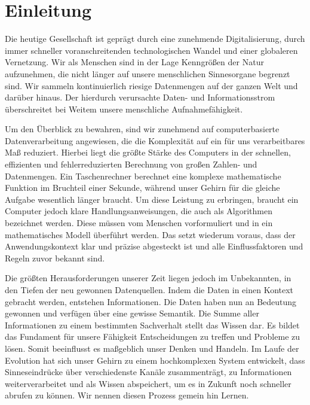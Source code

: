

\section{Einleitung}



Die heutige Gesellschaft ist geprägt durch eine zunehmende Digitalisierung, durch immer schneller voranschreitenden technologischen Wandel und einer globaleren Vernetzung. Wir als Menschen sind in der Lage Kenngrößen der Natur aufzunehmen, die nicht länger auf unsere menschlichen Sinnesorgane begrenzt sind. Wir sammeln kontinuierlich riesige Datenmengen auf der ganzen Welt und darüber hinaus. Der hierdurch verursachte Daten- und Informationsstrom überschreitet bei Weitem unsere menschliche Aufnahmefähigkeit.

Um den Überblick zu bewahren, sind wir zunehmend auf computerbasierte Datenverarbeitung angewiesen, die die Komplexität auf ein für uns verarbeitbares Maß reduziert. Hierbei liegt die größte Stärke des Computers in der schnellen, effizienten und fehlerreduzierten Berechnung von großen Zahlen- und Datenmengen. Ein Taschenrechner berechnet eine komplexe mathematische Funktion im Bruchteil einer Sekunde, während unser Gehirn für die gleiche Aufgabe wesentlich länger braucht. Um diese Leistung zu erbringen, braucht ein Computer jedoch klare Handlungsanweisungen, die auch als Algorithmen bezeichnet werden. Diese müssen vom Menschen vorformuliert und in ein mathematisches Modell überführt werden. Das setzt wiederum voraus, dass der Anwendungskontext klar und präzise abgesteckt ist und alle Einflussfaktoren und Regeln zuvor bekannt sind.

Die größten Herausforderungen unserer Zeit liegen jedoch im Unbekannten, in den Tiefen der neu gewonnen Datenquellen. Indem die Daten in einen Kontext gebracht werden, entstehen Informationen. Die Daten haben nun an Bedeutung gewonnen und verfügen über eine gewisse Semantik. Die Summe aller Informationen zu einem bestimmten Sachverhalt stellt das Wissen dar. Es bildet das Fundament für unsere Fähigkeit Entscheidungen zu treffen und Probleme zu lösen. Somit beeinflusst es maßgeblich unser Denken und Handeln. Im Laufe der Evolution hat sich unser Gehirn zu einem hochkomplexen System entwickelt, dass Sinneseindrücke über verschiedenste Kanäle zusammenträgt, zu Informationen weiterverarbeitet und als Wissen abspeichert, um es in Zukunft noch schneller abrufen zu können. Wir nennen diesen Prozess gemein hin Lernen.

